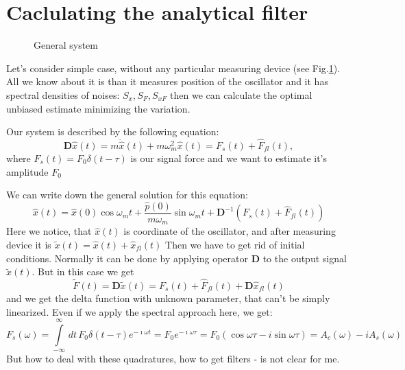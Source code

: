\documentclass[notitlepage,a4paper,11pt,hyperref=pdftex]{revtex4-1}
\newcommand{\I}[2]{\int\limits_{#1}^{#2}\,}
\begin{document}
\section{Caclulating the analytical filter}\label{appx:filters}
\begin{figure}
\caption{General system}
\label{fig:meas}
\end{figure}

Let's consider simple case, without any particular measuring device (see Fig.\ref{fig:meas}). All we know about it is than it measures position of the oscillator and it has spectral densities of noises: $S_x,S_F, S_{xF}$
then we can calculate the optimal unbiased estimate minimizing the variation.

Our system is described by the following equation:
\begin{equation}
 \mathbf{D}\hat{x}(t) = m\ddot{\hat{x}}(t) + m \omega_m^2 \hat{x}(t) = F_s(t) + \hat{F}_{fl}(t), 
\end{equation}
where $F_s(t) = F_0\delta(t-\tau)$ is our signal force and we want to estimate it's amplitude $F_0$

We can write down the general solution for this equation:
\begin{equation}
 \hat{x}(t) = \hat{x}(0)\cos\omega_mt + \frac{\hat{p}(0)}{m\omega_m}\sin\omega_mt + \mathbf{D}^{-1}(F_s(t) + \hat{F}_{fl}(t))
\end{equation}
Here we notice, that $\hat{x}(t)$ is coordinate of the oscillator, and after measuring device it is $\tilde{x}(t) = \hat{x}(t)+\hat{x}_{fl}(t)$
Then we have to get rid of initial conditions. Normally it can be done by applying operator $\mathbf{D}$ to the output signal $\tilde{x}(t)$. But in this case we get 
\begin{equation}
 \tilde{F}(t) = \mathbf{D}\tilde{x}(t) = F_s(t) + \hat{F}_{fl}(t) + \mathbf{D}\hat{x}_{fl}(t)
\end{equation}
and we get the delta function with unknown parameter, that can't be simply linearized. 
Even if we apply the spectral approach here, we get:
\begin{equation}
 F_s(\omega) = \I{-\infty}{\infty}dt\,F_0\delta(t-\tau)e^{-\imath\omega t} = F_0 e^{-\imath\omega \tau} = F_0 (\cos\omega\tau - i \sin\omega\tau) = A_c(\omega) - i A_s(\omega)
\end{equation}
But how to deal with these quadratures, how to get filters - is not clear for me.
\end{document}

